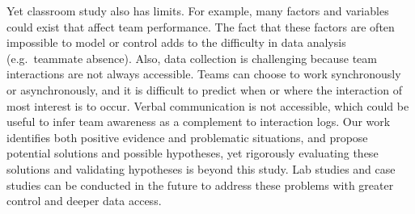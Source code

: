 Yet classroom study also has limits. For example, many factors and
variables could exist that affect team performance. The fact that these
factors are often impossible to model or control adds to the difficulty
in data analysis (e.g.~teammate absence). Also, data collection is
challenging because team interactions are not always accessible. Teams
can choose to work synchronously or asynchronously, and it is difficult
to predict when or where the interaction of most interest is to occur.
Verbal communication is not accessible, which could be useful to infer
team awareness as a complement to interaction logs. Our work identifies
both positive evidence and problematic situations, and propose potential
solutions and possible hypotheses, yet rigorously evaluating these
solutions and validating hypotheses is beyond this study. Lab studies
and case studies can be conducted in the future to address these
problems with greater control and deeper data access.
